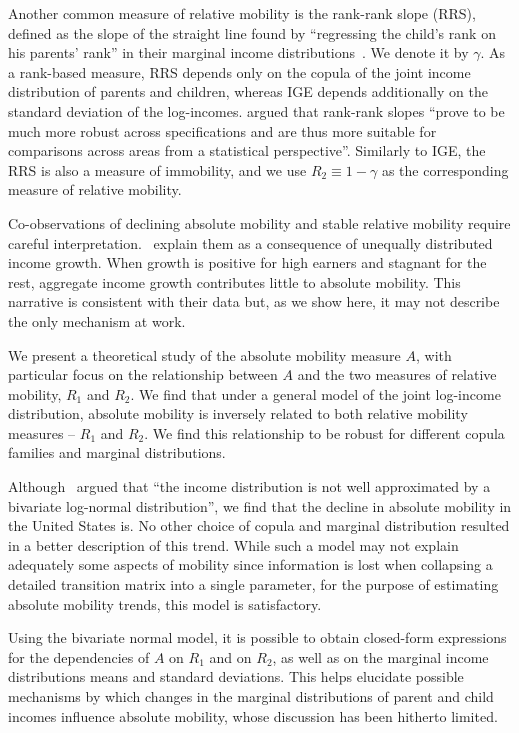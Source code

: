 \documentclass[12pt,a4paper]{article}
\numberwithin{equation}{section}
\begin{document}
Another common measure of relative mobility is the rank-rank slope (RRS), defined as the slope of the straight line found by ``regressing the child's rank on his parents' rank'' in their marginal income distributions~\citep[p.~1561]{chetty2014land}. We denote it by $\gamma$. As a rank-based measure, RRS depends only on the copula of the joint income distribution of parents and children, whereas IGE depends additionally on the standard deviation of the log-incomes. \citet[p.~1561]{chetty2014land} argued that rank-rank slopes ``prove to be much more robust across specifications and are thus more suitable for comparisons across areas from a statistical perspective''. Similarly to IGE, the RRS is also a measure of immobility, and we use $R_2 \equiv 1-\gamma$ as the corresponding measure of relative mobility.

Co-observations of declining absolute mobility and stable relative mobility require careful interpretation.~\citet{chetty2017fading} explain them as a consequence of unequally distributed income growth. When growth is positive for high earners and stagnant for the rest, aggregate income growth contributes little to absolute mobility. This narrative is consistent with their data but, as we show here, it may not describe the only mechanism at work.

We present a theoretical study of the absolute mobility measure $A$, with particular focus on the relationship between $A$ and the two measures of relative mobility, $R_1$ and $R_2$. We find that under a general model of the joint log-income distribution, absolute mobility is inversely related to both relative mobility measures -- $R_1$ and $R_2$. We find this relationship to be robust for different copula families and marginal distributions.

Although~\citet[p.~1574]{chetty2014land} argued that ``the income distribution is not well approximated by a bivariate log-normal distribution'', we find that the decline in absolute mobility in the United States is. No other choice of copula and marginal distribution resulted in a better description of this trend. While such a model may not explain adequately some aspects of mobility since information is lost when collapsing a detailed transition matrix into a single parameter, for the purpose of estimating absolute mobility trends, this model is satisfactory.

Using the bivariate normal model, it is possible to obtain closed-form expressions for the dependencies of $A$ on $R_1$ and on $R_2$, as well as on the marginal income distributions means and standard deviations. This helps elucidate possible mechanisms by which changes in the marginal distributions of parent and child incomes influence absolute mobility, whose discussion has been hitherto limited.
\end{document}
